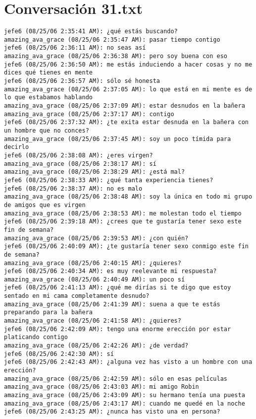 \section{Conversaci\'on 31.txt}

\begin{verbatim}
jefe6 (08/25/06 2:35:41 AM): ¿qué estás buscando?
amazing_ava_grace (08/25/06 2:35:47 AM): pasar tiempo contigo
jefe6 (08/25/06 2:36:11 AM): no seas así
amazing_ava_grace (08/25/06 2:36:38 AM): pero soy buena con eso 
jefe6 (08/25/06 2:36:50 AM): me estás induciendo a hacer cosas y no me dices qué tienes en mente
jefe6 (08/25/06 2:36:57 AM): sólo sé honesta
amazing_ava_grace (08/25/06 2:37:05 AM): lo que está en mi mente es de lo que estabamos hablando 
amazing_ava_grace (08/25/06 2:37:09 AM): estar desnudos en la bañera
amazing_ava_grace (08/25/06 2:37:17 AM): contigo 
jefe6 (08/25/06 2:37:32 AM): ¿te exita estar desnuda en la bañera con un hombre que no conces?
amazing_ava_grace (08/25/06 2:37:45 AM): soy un poco tímida para decirlo
jefe6 (08/25/06 2:38:08 AM): ¿eres virgen?
amazing_ava_grace (08/25/06 2:38:17 AM): sí
amazing_ava_grace (08/25/06 2:38:29 AM): ¿está mal?
jefe6 (08/25/06 2:38:33 AM): ¿qué tanta experiencia tienes?
jefe6 (08/25/06 2:38:37 AM): no es malo
amazing_ava_grace (08/25/06 2:38:48 AM): soy la única en todo mi grupo de amigos que es virgen
amazing_ava_grace (08/25/06 2:38:53 AM): me molestan todo el tiempo
jefe6 (08/25/06 2:39:18 AM): ¿crees que te gustaría tener sexo este fin de semana?
amazing_ava_grace (08/25/06 2:39:53 AM): ¿con quién?
jefe6 (08/25/06 2:40:09 AM): ¿te gustaría tener sexo conmigo este fin de semana?
amazing_ava_grace (08/25/06 2:40:15 AM): ¿quieres?
jefe6 (08/25/06 2:40:34 AM): es muy reelevante mi respuesta?
amazing_ava_grace (08/25/06 2:40:49 AM): un poco sí
jefe6 (08/25/06 2:41:13 AM): ¿qué me dirías si te digo que estoy sentado en mi cama completamente desnudo?
amazing_ava_grace (08/25/06 2:41:39 AM): suena a que te estás preparando para la bañera 
amazing_ava_grace (08/25/06 2:41:58 AM): ¿quieres?
jefe6 (08/25/06 2:42:09 AM): tengo una enorme erección por estar platicando contigo
amazing_ava_grace (08/25/06 2:42:26 AM): ¿de verdad?
jefe6 (08/25/06 2:42:30 AM): sí
jefe6 (08/25/06 2:42:43 AM): ¿alguna vez has visto a un hombre con una erección?
amazing_ava_grace (08/25/06 2:42:59 AM): sólo en esas películas
amazing_ava_grace (08/25/06 2:43:03 AM): mi amigo Robin
amazing_ava_grace (08/25/06 2:43:09 AM): su hermano tenía una puesta
amazing_ava_grace (08/25/06 2:43:17 AM): cuando me quedé en la noche
jefe6 (08/25/06 2:43:25 AM): ¿nunca has visto una en persona?

\end{verbatim}
